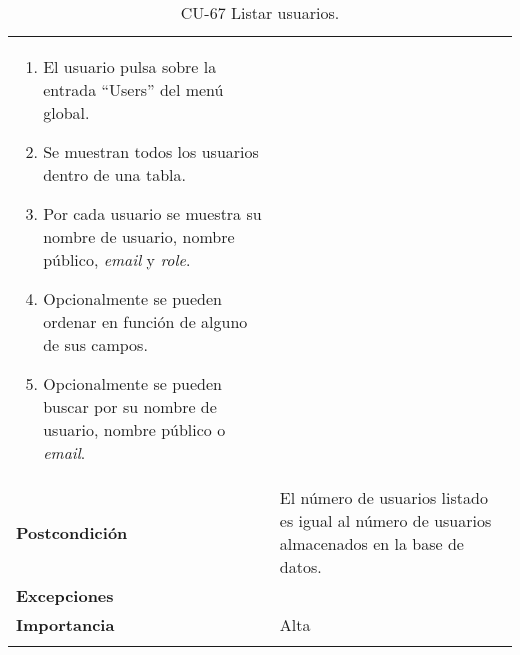 \begin{longtable}[]{@{}ll@{}}
\begin{minipage}[t]{0.74\columnwidth}
\begin{enumerate}
\def\labelenumi{\arabic{enumi}.}
\tightlist
\item
  El usuario pulsa sobre la entrada ``Users'' del menú global.
\item
  Se muestran todos los usuarios dentro de una tabla.
\item
  Por cada usuario se muestra su nombre de usuario, nombre público,
  \emph{email} y \emph{role}.
\item
  Opcionalmente se pueden ordenar en función de alguno de sus campos.
\item
  Opcionalmente se pueden buscar por su nombre de usuario, nombre
  público o \emph{email}.
\end{enumerate}\strut
\end{minipage}\tabularnewline
\begin{minipage}[t]{0.20\columnwidth}\raggedright
\textbf{Postcondición}\strut
\end{minipage} & \begin{minipage}[t]{0.74\columnwidth}\raggedright
El número de usuarios listado es igual al número de usuarios almacenados
en la base de datos.\strut
\end{minipage}\tabularnewline
\begin{minipage}[t]{0.20\columnwidth}\raggedright
\textbf{Excepciones}\strut
\end{minipage} & \begin{minipage}[t]{0.74\columnwidth}\raggedright
\strut
\end{minipage}\tabularnewline
\begin{minipage}[t]{0.20\columnwidth}\raggedright
\textbf{Importancia}\strut
\end{minipage} & \begin{minipage}[t]{0.74\columnwidth}\raggedright
Alta\strut
\end{minipage}\tabularnewline
\bottomrule
\caption{CU-67 Listar usuarios.}
\end{longtable}